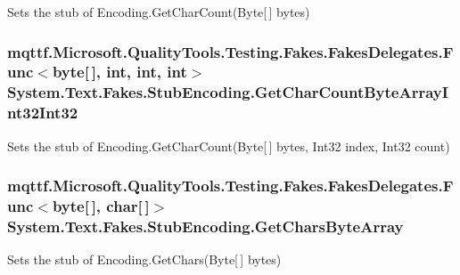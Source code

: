Sets the stub of Encoding.\-Get\-Char\-Count(\-Byte\mbox{[}$\,$\mbox{]} bytes)

\hypertarget{class_system_1_1_text_1_1_fakes_1_1_stub_encoding_a87cd93a095c0cad2b25a14dd9a23687e}{
\subsubsection[{Get\-Char\-Count\-Byte\-Array\-Int32\-Int32}]{\setlength{\rightskip}{0pt plus 5cm}mqttf.\-Microsoft.\-Quality\-Tools.\-Testing.\-Fakes.\-Fakes\-Delegates.\-Func$<$byte\mbox{[}$\,$\mbox{]}, int, int, int$>$ System.\-Text.\-Fakes.\-Stub\-Encoding.\-Get\-Char\-Count\-Byte\-Array\-Int32\-Int32}}\label{class_system_1_1_text_1_1_fakes_1_1_stub_encoding_a87cd93a095c0cad2b25a14dd9a23687e}


Sets the stub of Encoding.\-Get\-Char\-Count(\-Byte\mbox{[}$\,$\mbox{]} bytes, Int32 index, Int32 count)

\hypertarget{class_system_1_1_text_1_1_fakes_1_1_stub_encoding_ab161ff0447340859036f2db950b17606}{
\subsubsection[{Get\-Chars\-Byte\-Array}]{\setlength{\rightskip}{0pt plus 5cm}mqttf.\-Microsoft.\-Quality\-Tools.\-Testing.\-Fakes.\-Fakes\-Delegates.\-Func$<$byte\mbox{[}$\,$\mbox{]}, char\mbox{[}$\,$\mbox{]}$>$ System.\-Text.\-Fakes.\-Stub\-Encoding.\-Get\-Chars\-Byte\-Array}}\label{class_system_1_1_text_1_1_fakes_1_1_stub_encoding_ab161ff0447340859036f2db950b17606}


Sets the stub of Encoding.\-Get\-Chars(\-Byte\mbox{[}$\,$\mbox{]} bytes)

